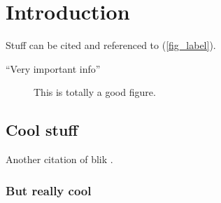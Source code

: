 \chapter{Introduction}\label{introduction}

Stuff can be cited \cite{Blik2021} and referenced to (\autoref{fig_label}).

\enquote{Very important info}

\localtableofcontents

\begin{figure}[ht]
    \centering
    \caption[Cool figure title]{This is totally a good figure.}
    \label{fig_label}
\end{figure}

\lipsum[1-10]

\section{Cool stuff}
\lipsum[1-3]

Another citation of blik \cite{Blik2021}.

\subsection{But really cool}
\lipsum[6-8]
